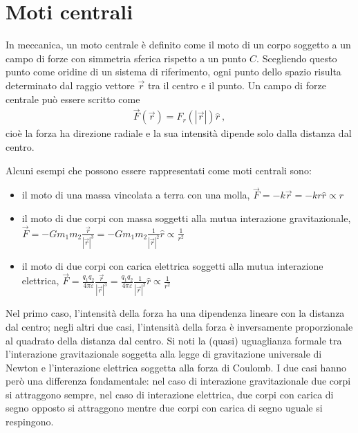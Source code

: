 \documentclass[letterpaper,10pt,italian]{jupyterBook}
\begin{document}
\section{Moti centrali}
\label{\detokenize{ch/mechanics/dynamics-central:moti-centrali}}\label{\detokenize{ch/mechanics/dynamics-central:physics-hs-mechanics-dynamics-motion-central}}\label{\detokenize{ch/mechanics/dynamics-central::doc}}
\sphinxAtStartPar
In meccanica, un moto centrale è definito come il moto di un corpo soggetto a un campo di forze con simmetria sferica rispetto a un punto \(C\). Scegliendo questo punto come oridine di un sistema di riferimento, ogni punto dello spazio risulta determinato dal raggio vettore \(\vec{r}\) tra il centro e il punto. Un campo di forze centrale può essere scritto come
\begin{equation*}
\begin{split}\vec{F}(\vec{r}) = F_r(|\vec{r}|) \hat{r} \ ,\end{split}
\end{equation*}
\sphinxAtStartPar
cioè la forza ha direzione radiale e la sua intensità dipende solo dalla distanza dal centro.

\sphinxAtStartPar
{} Alcuni esempi che possono essere rappresentati come moti centrali sono:
\begin{itemize}
\item {} 
\sphinxAtStartPar
il moto di una massa vincolata a terra con una molla, \(\vec{F} = - k \vec{r} = - k r \hat{r} \propto r\)

\item {} 
\sphinxAtStartPar
il moto di due corpi con massa soggetti alla mutua interazione gravitazionale, \(\vec{F} = - G m_1 m_2\frac{\vec{r}}{|\vec{r}|^3} = - G m_1 m_2\frac{1}{|\vec{r}|^2} \hat{r} \propto \frac{1}{r^2}\)

\item {} 
\sphinxAtStartPar
il moto di due corpi con carica elettrica soggetti alla mutua interazione elettrica, \(\vec{F} = \frac{q_1 q_2}{4\pi\varepsilon} \frac{\vec{r}}{|\vec{r}|^3} = \frac{q_1 q_2}{4\pi\varepsilon} \frac{1}{|\vec{r}|^2} \hat{r} \propto \frac{1}{r^2}\)

\end{itemize}

\sphinxAtStartPar
Nel primo caso, l’intensità della forza ha una dipendenza lineare con la distanza dal centro; negli altri due casi, l’intensità della forza è inversamente proporzionale al quadrato della distanza dal centro. Si noti la (quasi) uguaglianza formale tra l’interazione gravitazionale soggetta alla legge di gravitazione universale di Newton e l’interazione elettrica soggetta alla forza di Coulomb. I due casi hanno però una differenza fondamentale: nel caso di interazione gravitazionale due corpi si attraggono sempre, nel caso di interazione elettrica, due corpi con carica di segno opposto si attraggono mentre due corpi con carica di segno uguale si respingono.
\end{document}
